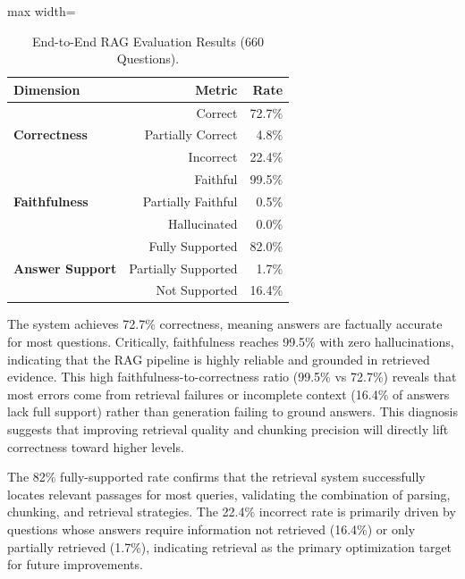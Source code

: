 \begin{table}[H]
    \centering
    \caption{End-to-End RAG Evaluation Results (660 Questions).}
    \label{tab:e2e_results}
    \begin{adjustbox}{max width=\linewidth}
    \begin{tabular}{lrr}
        \toprule
        \textbf{Dimension} & \textbf{Metric} & \textbf{Rate} \\
        \midrule
        \multirow{3}{*}{\textbf{Correctness}} & Correct & 72.7\% \\
        & Partially Correct & 4.8\% \\
        & Incorrect & 22.4\% \\
        \midrule
        \multirow{3}{*}{\textbf{Faithfulness}} & Faithful & 99.5\% \\
        & Partially Faithful & 0.5\% \\
        & Hallucinated & 0.0\% \\
        \midrule
        \multirow{3}{*}{\textbf{Answer Support}} & Fully Supported & 82.0\% \\
        & Partially Supported & 1.7\% \\
        & Not Supported & 16.4\% \\
        \bottomrule
    \end{tabular}
    \end{adjustbox}
\end{table}

The system achieves 72.7\% correctness, meaning answers are factually accurate for most questions. Critically, faithfulness reaches 99.5\% with zero hallucinations, indicating that the RAG pipeline is highly reliable and grounded in retrieved evidence. This high faithfulness-to-correctness ratio (99.5\% vs 72.7\%) reveals that most errors come from retrieval failures or incomplete context (16.4\% of answers lack full support) rather than generation failing to ground answers. This diagnosis suggests that improving retrieval quality and chunking precision will directly lift correctness toward higher levels.

The 82\% fully-supported rate confirms that the retrieval system successfully locates relevant passages for most queries, validating the combination of parsing, chunking, and retrieval strategies. The 22.4\% incorrect rate is primarily driven by questions whose answers require information not retrieved (16.4\%) or only partially retrieved (1.7\%), indicating retrieval as the primary optimization target for future improvements.

